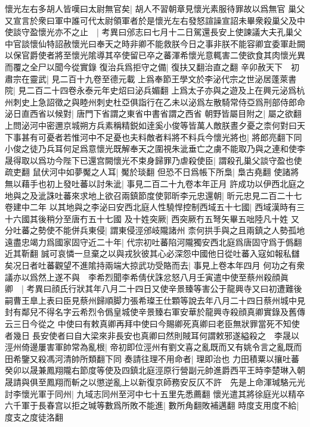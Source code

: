 懷光左右多胡人皆嘆曰太尉無官矣|{
	胡人不習朝章見懷光素服待罪故以爲無官}
巢父又宣言於衆曰軍中誰可代太尉領軍者於是懷光左右發怒諠譟宣詔未畢衆殺巢父及中使談守盈懷光亦不之止　|{
	考異曰邠志曰七月十二日駕還長安上使諫議大夫孔巢父中官談懷仙特詔赦懷光曰奉天之時非卿不能救朕今日之事非朕不能容卿宜委軍赴闕以保官爵使者將至懷光隂導其卒使留已卒之蕃渾希懷光意輒害二使欲食其肉懷光異而覆之全尸以聞今從實錄}
復治兵爲拒守之備|{
	復扶又翻治直之翻}
辛卯赦天下　初肅宗在靈武|{
	見二百十九卷至德元載}
上爲奉節王學文於李泌代宗之世泌居蓬萊書院|{
	見二百二十四卷永泰元年史炤曰泌兵媚翻}
上爲太子亦與之遊及上在興元泌爲杭州刺史上急詔徵之與睦州刺史杜亞俱詣行在乙未以泌爲左散騎常侍亞爲刑部侍郎命泌日直西省以候對|{
	唐門下省謂之東省中書省謂之西省}
朝野皆屬目附之|{
	屬之欲翻}
上問泌河中密邇京城朔方兵素稱精鋭如逹奚小俊等皆萬人敵朕晝夕憂之柰何對曰天下事甚有可憂者若惟河中不足憂也夫料敵者料將不料兵今懷光將也|{
	將郎亮翻下同}
小俊之徒乃兵耳何足爲意懷光既解奉天之圍視朱泚垂亡之虜不能取乃與之連和使李晟得取以爲功今陛下已還宫闕懷光不束身歸罪乃虐殺使臣|{
	謂殺孔巢父談守盈也使疏吏翻}
鼠伏河中如夢魘之人耳|{
	魘於琰翻}
但恐不日爲帳下所梟|{
	梟古堯翻}
使諸將無以藉手也初上發吐蕃以討朱泚|{
	事見二百二十九卷本年正月}
許成功以伊西北庭之地與之及泚誅吐蕃來求地上欲召兩鎮節度使郭昕李元忠還朝|{
	昕元忠見二百二十七卷建中二年}
以其地與之李泌曰安西北庭人性驍悍控制西域五十七國|{
	西域漢時有三十六國其後稍分至唐冇五十七國}
及十姓突厥|{
	西突厥冇五弩矢畢五咄陸凡十姓}
又分吐蕃之勢使不能併兵東侵|{
	謂東侵涇邠岐隴諸州}
柰何拱手與之且兩鎮之人勢孤地遠盡忠竭力爲國家固守近二十年|{
	代宗初吐蕃陷河隴獨安西北庭爲唐固守爲于僞翻近其靳翻}
誠可哀憐一旦棄之以與戎狄彼其心必深怨中國他日從吐蕃入寇如報私讎矣况日者吐蕃觀望不進隂持兩端大掠武功受賂而去|{
	事見上卷本年四月}
何功之有衆議亦以爲然上遂不與　李希烈聞李希倩伏誅忿怒八月壬寅遣中使至蔡州殺顔眞卿　|{
	考異曰顔氏行狀其年八月二十四日又使辛景臻等害公于龍興寺又曰初遭難後嗣曹王臯上表曰臣見蔡州歸順脚力張希璨王仕顆等說去年八月二十四日蔡州城中見封有鄰兒不得名字云希烈令僞皇城使辛景臻右軍安華於龍興寺殺顔真卿實錄及舊傳云三日今從之}
中使曰有敕真卿再拜中使曰今賜卿死真卿曰老臣無狀罪當死不知使者幾日長安使者曰自大梁來非長安也真卿曰然則賊耳何謂敕邪遂縊殺之　李晟以涇州倚邊屢害軍帥常為亂根|{
	帝初即位涇州有劉文喜之亂既而又有姚令言之亂既而田希鑒又殺馮河清帥所類翻下同}
奏請往理不用命者|{
	理即治也}
力田積粟以攘吐蕃癸卯以晟兼鳳翔隴右節度等使及四鎮北庭涇原行營副元帥進爵西平王時李楚琳入朝晟請與俱至鳳翔而斬之以懲逆亂上以新復京師務安反仄不許　先是上命渾瑊駱元光討李懷光軍于同州|{
	九域志同州至河中七十五里先悉薦翻}
懷光遣其將徐庭光以精卒六千軍于長春宫以拒之瑊等數爲所敗不能進|{
	數所角翻敗補邁翻}
時度支用度不給|{
	度支之度徒洛翻}
